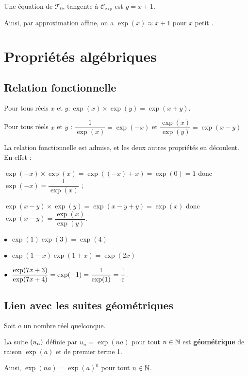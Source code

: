 \documentclass[a4paper,11pt]{article}
\begin{document}
\begin{cprop}
Une équation de $\mathscr{T}_0$, tangente à $\mathscr{C}_{\exp}$ est $y=x+1$.

Ainsi, par approximation affine, on a $\exp(x) \approx x+1$ pour $x$ \og petit \fg.
\end{cprop}

\section{Propriétés algébriques}

\subsection{Relation fonctionnelle}

\begin{cthm}
Pour tous réels $x$ et $y : \exp(x)\times \exp(y)=\exp(x+y)$.
\end{cthm}

\begin{cprop}[s]
Pour tous réels $x$ et $y$ : $\dfrac{1}{\exp(x)}=\exp(-x)$ et $\dfrac{\exp(x)}{\exp(y)}=\exp(x-y)$
\end{cprop}

\begin{cdemo}
La relation fonctionnelle est admise, et les deux autres propriétés en découlent. En effet :

\tabula{}$\exp(-x)\times \exp(x)=\exp((-x)+x)=\exp(0)=1$ donc $\exp(-x)=\dfrac{1}{\exp(x)}$ ;

\tabula{}$\exp(x-y)\times \exp(y)=\exp(x-y+y)=\exp(x)$ donc $\exp(x-y)=\dfrac{\exp(x)}{\exp(y)}$.
\end{cdemo}

\begin{cexemple}[s]	
$\bullet~~\exp(1)\exp(3)=\exp(4)$

$\bullet~~\exp(1-x)\exp(1+x)=\exp(2x)$

$\bullet~~\dfrac{\exp(7x+3)}{\exp(7x+4)}=\exp(-1)=\dfrac{1}{\exp(1)}=\dfrac{1}{{\rm e}}$.
\end{cexemple}

\subsection{Lien avec les suites géométriques}

\begin{cprop}
Soit $a$ un nombre réel quelconque.

La suite $\left( u_n \right)$ définie par $u_n=\exp(na)$ pour tout $n \in \N$ est \textbf{géométrique} de raison $\exp(a)$ et de premier terme 1.

Ainsi, $\exp(na)=\exp(a)^n$ pour tout $n \in \N$.
\end{cprop}
\end{document}
